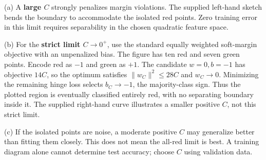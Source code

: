 (a) A \textbf{large \(C\)} strongly penalizes margin violations. The supplied left-hand sketch bends the boundary to accommodate the isolated red points. Zero training error in this limit requires separability in the chosen quadratic feature space.


(b) For the \textbf{strict limit \(C\to0^+\)}, use the standard equally weighted soft-margin objective with an unpenalized bias. The figure has ten red and seven green points. Encode red as \(-1\) and green as \(+1\). The candidate \(w=0,b=-1\) has objective \(14C\), so the optimum satisfies \(\|w_C\|^2\le28C\) and \(w_C\to0\). Minimizing the remaining hinge loss selects \(b_C\to-1\), the majority-class sign. Thus the plotted region is eventually classified entirely red, with no separating boundary inside it. The supplied right-hand curve illustrates a smaller positive \(C\), not this strict limit.


(c) If the isolated points are noise, a moderate positive \(C\) may generalize better than fitting them closely. This does not mean the all-red limit is best. A training diagram alone cannot determine test accuracy; choose \(C\) using validation data.
